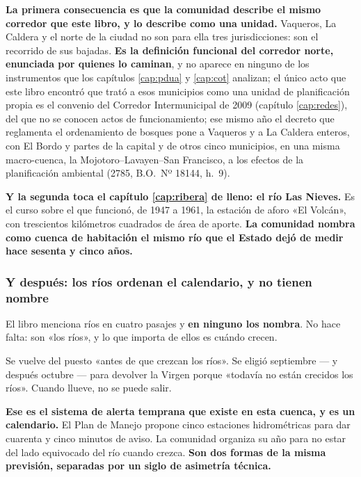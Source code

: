 \textbf{La primera consecuencia es que la comunidad describe el mismo corredor que este libro,
y lo describe como una unidad.} Vaqueros, La Caldera y el norte de la ciudad no son para ella
tres jurisdicciones: son el recorrido de sus bajadas. \textbf{Es la definición funcional del
corredor norte, enunciada por quienes lo caminan}, y no aparece en ninguno de los instrumentos que los capítulos \ref{cap:pdua} y \ref{cap:cot} analizan; el único acto que este libro encontró que trató a esos municipios como una unidad de planificación propia es el convenio del Corredor Intermunicipal de 2009 (capítulo \ref{cap:redes}), del que no se conocen actos de funcionamiento; ese mismo año el decreto que reglamenta el ordenamiento de bosques pone a Vaqueros y a La Caldera enteros, con El Bordo y partes de la capital y de otros cinco municipios, en una misma macro-cuenca, la Mojotoro--Lavayen--San Francisco, a los efectos de la planificación ambiental (2785, B.O.\ Nº 18144, h.\ 9).

\textbf{Y la segunda toca el capítulo \ref{cap:ribera} de lleno: el río Las Nieves.} Es el curso sobre el que
funcionó, de 1947 a 1961, la estación de aforo «El Volcán», con trescientos kilómetros
cuadrados de área de aporte. \textbf{La comunidad nombra como cuenca de habitación el mismo
río que el Estado dejó de medir hace sesenta y cinco años.}

\subsubsection*{Y después: los ríos ordenan el calendario, y no tienen nombre}

El libro menciona ríos en cuatro pasajes y \textbf{en ninguno los nombra}. No hace falta: son
«los ríos», y lo que importa de ellos es cuándo crecen.

\begin{cautela}
Se vuelve del puesto «antes de que crezcan los ríos». Se eligió septiembre --- y después
octubre --- para devolver la Virgen porque «todavía no están crecidos los ríos». Cuando
llueve, no se puede salir.

\textbf{Ese es el sistema de alerta temprana que existe en esta cuenca, y es un calendario.}
El Plan de Manejo propone cinco estaciones hidrométricas para dar cuarenta y cinco minutos de
aviso. La comunidad organiza su año para no estar del lado equivocado del río cuando crezca.
\textbf{Son dos formas de la misma previsión, separadas por un siglo de asimetría técnica.}
\end{cautela}

